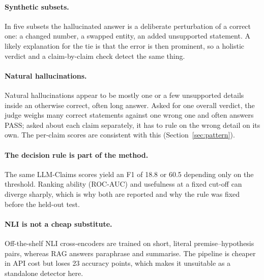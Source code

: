 \documentclass[11pt,a4paper]{article}
\begin{document}
\paragraph{Synthetic subsets.}
In five subsets the hallucinated answer is a deliberate perturbation of a correct one: a
changed number, a swapped entity, an added unsupported statement. A likely explanation
for the tie is that the error is then prominent, so a holistic verdict and a
claim-by-claim check detect the same thing.

\paragraph{Natural hallucinations.}
Natural hallucinations appear to be mostly one or a few unsupported details inside an
otherwise correct, often long answer. Asked for one overall verdict, the judge weighs many correct
statements against one wrong one and often answers PASS; asked about each claim
separately, it has to rule on the wrong detail on its own. The per-claim scores are
consistent with this (Section~\ref{sec:pattern}).

\paragraph{The decision rule is part of the method.}
The same LLM-Claims scores yield an F1 of 18.8 or 60.5 depending only on the threshold.
Ranking ability (ROC-AUC) and usefulness at a fixed cut-off can diverge sharply, which
is why both are reported and why the rule was fixed before the held-out test.

\paragraph{NLI is not a cheap substitute.}
Off-the-shelf NLI cross-encoders are trained on short, literal premise--hypothesis
pairs, whereas RAG answers paraphrase and summarise. The pipeline is cheaper in API cost
but loses 23 accuracy points, which makes it unsuitable as a standalone detector here.
\end{document}
